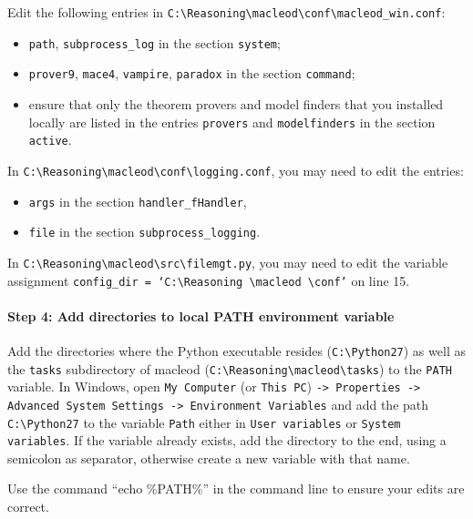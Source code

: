 \documentclass{article}
\begin{document}
Edit the following entries in \texttt{C:\textbackslash Reasoning\textbackslash macleod\textbackslash conf\textbackslash macleod\_win.conf}:
\begin{itemize}
\item  \texttt{path}, \texttt{subprocess\_log} in the section \texttt{system};
\item \texttt{prover9}, \texttt{mace4}, \texttt{vampire}, \texttt{paradox} in the section \texttt{command};
\item ensure that only the theorem provers and model finders that you installed locally are listed in the entries \texttt{provers} and \texttt{modelfinders} in the section \texttt{active}.
\end{itemize}
In \texttt{C:\textbackslash Reasoning\textbackslash macleod\textbackslash conf\textbackslash logging.conf}, you may need to edit the entries:
\begin{itemize}
\item \texttt{args} in the section \texttt{handler\_fHandler},
\item \texttt{file}  in the section \texttt{subprocess\_logging}.
\end{itemize}
In \texttt{C:\textbackslash Reasoning\textbackslash macleod\textbackslash src\textbackslash filemgt.py}, you may need to edit the variable assignment \texttt{config\_dir = `C:\textbackslash Reasoning \textbackslash macleod \textbackslash conf'} on line 15.


\paragraph{Step 4: Add directories to local PATH environment variable}

Add the directories where the Python executable resides (\texttt{C:\textbackslash Python27}) as well as the \texttt{tasks} subdirectory of macleod (\texttt{C:\textbackslash Reasoning\textbackslash macleod\textbackslash tasks}) to the \texttt{PATH} variable. In Windows, open \texttt{My Computer} (or \texttt{This PC}) \texttt{-> Properties -> Advanced System Settings -> Environment Variables} and add the path \texttt{C:\textbackslash Python27} to the variable \texttt{Path} either in \texttt{User variables} or \texttt{System variables}. If the variable already exists, add the directory to the end, using a semicolon as separator, otherwise create a new variable with that name. 

Use the command ``echo \%PATH\%'' in the command line to ensure your edits are correct.
\end{document}
